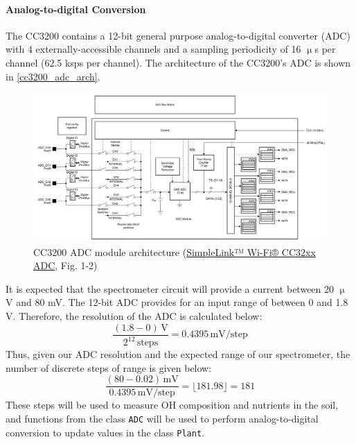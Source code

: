 \paragraph{Analog-to-digital Conversion}
The CC3200 contains a 12-bit general purpose analog-to-digital converter
(ADC) with 4 externally-accessible channels and a sampling periodicity of
16 $\upmu$s per channel (62.5 ksps per channel). The architecture of the
CC3200's ADC is shown in \autoref{cc3200_adc_arch}.
\begin{figure}[H]
    \caption{CC3200 ADC module architecture (\href{https://www.ti.com/lit/an/swra679/swra679.pdf}{SimpleLink™ Wi-Fi® CC32xx ADC}, Fig. 1-2)}
    \label{cc3200_adc_arch}
    \centering
    \includegraphics[width=\textwidth]{images/cc3200_adc_arch.png}
\end{figure}

It is expected that the spectrometer circuit will provide a current
between 20 $\upmu$V and 80 mV. The 12-bit ADC provides for an input range of
between 0 and 1.8 V. Therefore, the resolution of the ADC is calculated
below:
\begin{equation}
    \label{eq:adc_res}
    \frac{(1.8 - 0)\,\mathrm{V}}{2^{12}\,\mathrm{steps}} =
    0.4395\,\mathrm{mV}/\mathrm{step}
\end{equation}
Thus, given our ADC resolution and the expected range of our spectrometer,
the number of discrete steps of range is given below:
\begin{equation}
    \label{eq:adc_steps}
    \frac{(80 - 0.02)\,\mathrm{mV}}{0.4395\,\mathrm{mV}/\mathrm{step}} =
    \lfloor181.98\rfloor = 181
\end{equation}
These steps will be used to measure OH composition and nutrients in the
soil, and functions from the class \texttt{ADC} will be used to perform
analog-to-digital conversion to update values in the class \texttt{Plant}.

